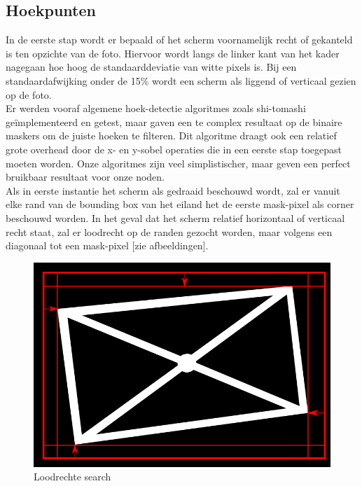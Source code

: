 \subsection{Hoekpunten}
In de eerste stap wordt er bepaald of het scherm voornamelijk recht of gekanteld is ten opzichte van de foto. Hiervoor wordt langs de linker kant van het kader nagegaan hoe hoog de standaarddeviatie van witte pixels is. Bij een standaardafwijking onder de 15\% wordt een scherm als liggend of verticaal gezien op de foto.\\
Er werden vooraf algemene hoek-detectie algoritmes zoals shi-tomashi geïmplementeerd en getest, maar gaven een te complex resultaat op de binaire maskers om de juiste hoeken te filteren. Dit algoritme draagt ook een relatief grote overhead door de x- en y-sobel operaties die in een eerste stap toegepast moeten worden. Onze algoritmes zijn veel simplistischer, maar geven een perfect bruikbaar resultaat voor onze noden.\\
Als in eerste instantie het scherm als gedraaid beschouwd wordt, zal er vanuit elke rand van de bounding box van het eiland het de eerste mask-pixel als corner beschouwd worden. In het geval dat het scherm relatief horizontaal of verticaal recht staat, zal er loodrecht op de randen gezocht worden, maar volgens een diagonaal tot een mask-pixel [zie afbeeldingen].\\

\begin{figure}[h]
\centering
\includegraphics[scale=0.6]{img/perpSearch.png}
\caption{Loodrechte search}
\end{figure}

